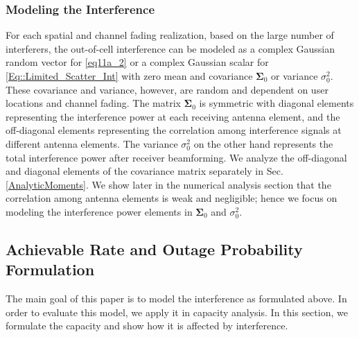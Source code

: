\documentclass[12pt, draftclsnofoot, onecolumn]{IEEEtran}
\theoremstyle{plain}
\begin{document}
\subsubsection{Modeling the Interference}
For each spatial and channel fading realization, %
based on the large number of interferers, the out-of-cell interference can be modeled as a complex Gaussian random vector for \eqref{eq11a_2} or a complex Gaussian scalar for \eqref{Eq::Limited_Scatter_Int} with zero mean and covariance $\boldsymbol{\Sigma}_{0}$ or variance ${\sigma}_{0}^2$. These covariance and variance, however, {are random and dependent on user locations and channel fading}. The matrix $\boldsymbol{\Sigma}_{0}$ is symmetric with diagonal elements representing the interference power at each receiving antenna element, and the off-diagonal elements representing the correlation among interference signals at different antenna elements. {\color{black} The variance ${\sigma}_{0}^2$ on the other hand represents the total interference power after receiver beamforming.}
We analyze the off-diagonal and diagonal elements of the covariance matrix separately in Sec. \ref{AnalyticMoments}. We show later in the numerical analysis section that the correlation among antenna elements is weak and negligible; hence we focus on modeling the interference power elements in $\boldsymbol{\Sigma}_{0}$ and ${\sigma}_{0}^2$.
%
\vspace{-.2in}
\subsection{Achievable Rate and Outage Probability Formulation}\label{DomBeam}\vspace{-.1in}
{\color{black}The main goal of this paper is to model the interference as formulated above. In order to evaluate this model, we apply it in capacity analysis. In this section, we formulate the capacity and show how it is affected by interference.}

\end{document}
